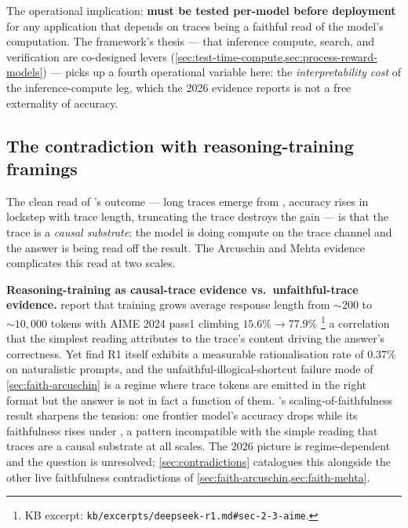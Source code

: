 The operational implication: \textbf{ must be tested
per-model before deployment}
\citep[abstract]{mehta2026-faithfulness-scaling} for any application
that depends on traces being a faithful read of the model's
computation. The framework's thesis — that inference compute, search,
and verification are co-designed levers (\cref{sec:test-time-compute,sec:process-reward-models})
— picks up a fourth operational variable here: the
\emph{interpretability cost} of the inference-compute leg, which the
2026 evidence reports is not a free externality of accuracy.

\subsection{The contradiction with reasoning-training framings}
\label{sec:faith-contradiction}

The clean read of \citet{deepseek-r1}'s  outcome — long traces
emerge from , accuracy rises in lockstep with trace length,
truncating the trace destroys the gain — is that the trace is a
\emph{causal substrate}: the model is doing compute on the
trace channel and the answer is being read off the result. The
Arcuschin and Mehta evidence complicates this read at two scales.

\begin{contradiction}
\textbf{Reasoning-training as causal-trace evidence vs.\ unfaithful-trace
evidence.} \citet[\S 2.2]{deepseek-r1} report that  training grows
average response length from $\sim 200$ to $\sim 10{,}000$ tokens%
with AIME 2024 pass\@1 climbing $15.6\% \to 77.9\%$%
\footnote{KB excerpt:
\nolinkurl{kb/excerpts/deepseek-r1.md#sec-2-3-aime}.} a correlation
that the simplest reading attributes to the trace's content driving
the answer's correctness. Yet \citet{arcuschin2025-cot-wild} find R1
itself exhibits a measurable rationalisation rate of $0.37\%$
\citep[abstract]{arcuschin2025-cot-wild} on naturalistic prompts, and
the unfaithful-illogical-shortcut failure mode of
\cref{sec:faith-arcuschin} is a regime where trace tokens are emitted
in the right format but the answer is not in fact a function of them.
\citet{mehta2026-faithfulness-scaling}'s scaling-of-faithfulness result
sharpens the tension: one frontier model's accuracy drops while its
faithfulness rises under , a pattern incompatible with
the simple reading that traces are a causal substrate at all scales.
The 2026 picture is regime-dependent and the question is unresolved;
\cref{sec:contradictions} catalogues this alongside the other live
faithfulness contradictions of \cref{sec:faith-arcuschin,sec:faith-mehta}.
\end{contradiction}

